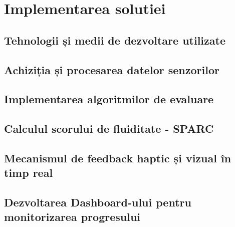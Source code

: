\chapter{Implementarea solutiei}
\section{Tehnologii și medii de dezvoltare utilizate}
\section{Achiziția și procesarea datelor senzorilor}
\section{Implementarea algoritmilor de evaluare}
\section{Calculul scorului de fluiditate - SPARC}
\section{Mecanismul de feedback haptic și vizual în timp real}
\section{Dezvoltarea Dashboard-ului pentru monitorizarea progresului}
